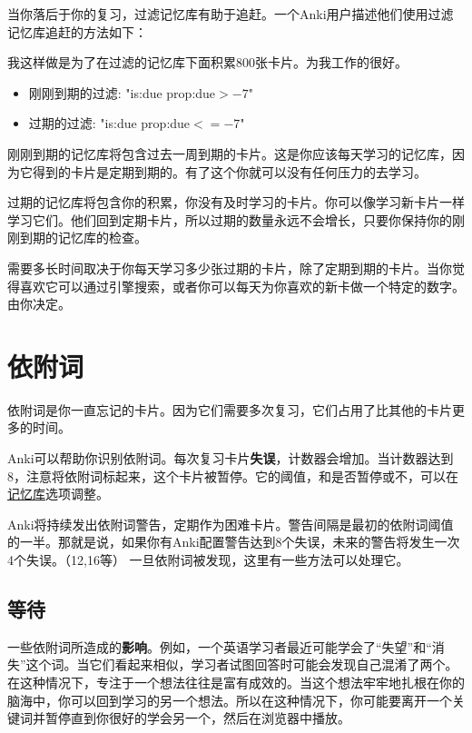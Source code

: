 \documentclass[a4paper]{book}
\begin{document}
		当你落后于你的复习，过滤记忆库有助于追赶。一个Anki用户描述他们使用过滤记忆库追赶的方法如下：
		
		我这样做是为了在过滤的记忆库下面积累800张卡片。为我工作的很好。
		
		\begin{fquote}
			\begin{itemize}
				\itemsep1pt\parskip0pt
				\item 刚刚到期的过滤: "is:due prop:due$>-7$"
				\item 过期的过滤: "is:due prop:due$<=-7$"
			\end{itemize}
			
			刚刚到期的记忆库将包含过去一周到期的卡片。这是你应该每天学习的记忆库，因为它得到的卡片是定期到期的。有了这个你就可以没有任何压力的去学习。
			
			过期的记忆库将包含你的积累，你没有及时学习的卡片。你可以像学习新卡片一样学习它们。他们回到定期卡片，所以过期的数量永远不会增长，只要你保持你的刚刚到期的记忆库的检查。
			
			需要多长时间取决于你每天学习多少张过期的卡片，除了定期到期的卡片。当你觉得喜欢它可以通过引擎搜索，或者你可以每天为你喜欢的新卡做一个特定的数字。由你决定。
		\end{fquote}
		
		\chapter{依附词}\label{}
		
		依附词是你一直忘记的卡片。因为它们需要多次复习，它们占用了比其他的卡片更多的时间。
		
		Anki可以帮助你识别依附词。每次复习卡片\textbf{失误}，计数器会增加。当计数器达到8，注意将依附词标起来，这个卡片被暂停。它的阈值，和是否暂停或不，可以在\hyperref[deckoptions]{记忆库}选项调整。
		
		Anki将持续发出依附词警告，定期作为困难卡片。警告间隔是最初的依附词阈值的一半。那就是说，如果你有Anki配置警告达到8个失误，未来的警告将发生一次4个失误。（12,16等）            一旦依附词被发现，这里有一些方法可以处理它。
		
		\section{等待}
		一些依附词所造成的\textbf{影响}。例如，一个英语学习者最近可能学会了“失望”和“消失”这个词。当它们看起来相似，学习者试图回答时可能会发现自己混淆了两个。在这种情况下，专注于一个想法往往是富有成效的。当这个想法牢牢地扎根在你的脑海中，你可以回到学习的另一个想法。所以在这种情况下，你可能要离开一个关键词并暂停直到你很好的学会另一个，然后在浏览器中播放。
		
\end{document}
